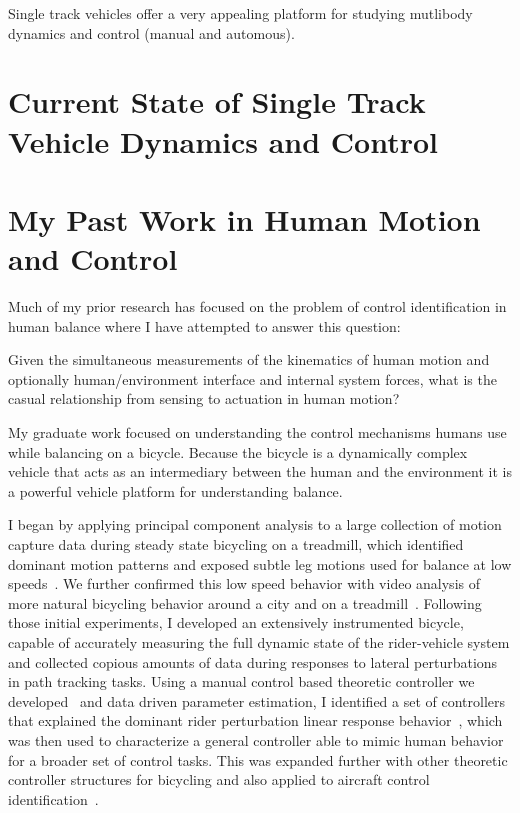 \documentclass{article}
\begin{document}
Single track vehicles offer a very appealing platform for studying mutlibody
dynamics and control (manual and automous).

\section{Current State of Single Track Vehicle Dynamics and Control}
%

\section{My Past Work in Human Motion and Control}
%
Much of my prior research has focused on the problem of control identification
in human balance where I have attempted to answer this question:

   Given the simultaneous measurements of the kinematics of human motion and
   optionally human/environment interface and internal system forces, what is
   the casual relationship from sensing to actuation in human motion?

My graduate work focused on understanding the control mechanisms humans use
while balancing on a bicycle. Because the bicycle is a dynamically complex
vehicle \cite{Astrom2005,Meijaard2007,Moore2007,Moore2008} that acts as an
intermediary between the human and the environment it is a powerful vehicle
platform for understanding balance.

I began by applying principal component analysis to a large collection of
motion capture data during steady state bicycling on a treadmill, which
identified dominant motion patterns and exposed subtle leg motions used for
balance at low speeds~\cite{Moore2009a,Moore2011c}. We further confirmed
this low speed behavior with video analysis of more natural bicycling behavior around a
city and on a treadmill~\cite{Kooijman2009}. Following those initial experiments, I
developed an extensively instrumented bicycle, capable of accurately measuring the full
dynamic state of the rider-vehicle system \cite{Moore2012,Moore2013} and
collected copious amounts of data during responses to lateral perturbations in
path tracking tasks. Using a manual control based theoretic controller we
developed~\cite{Hess2012} and data driven parameter estimation, I identified a set of
controllers that explained the dominant rider perturbation linear response
behavior~\cite{Moore2012}, which was then used to characterize a general controller
able to mimic human behavior for a broader set of control tasks. This was
expanded further with other theoretic controller structures for bicycling
\cite{Schwab2012a,Schwab2012,Schwab2013} and also applied to aircraft control
identification~\cite{Hess2013}.
\end{document}
